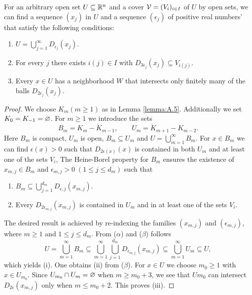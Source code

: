\begin{proposition}\label{proposition:A.6}
  For an arbitrary open set $U\subseteq{\ensuremath{\mathbb{R}}}^n$ and a cover $\mathcal{V}=(V_i)_{i\in I}$ of
  $U$ by open sets, we can find a sequence $(x_j)$ in $U$ and a sequence $(\epsilon_j)$ of positive
  real numbers' that satisfy the following conditions:
  \begin{enumerate}
    \item $U = \bigcup_{j=1}^\infty D_{\epsilon_j}(x_j)$.
    \item For every $j$ there exists $i(j)\in I$ with $D_{3\epsilon_j}(x_j)\subseteq V_{i(j)}$.
    \item Every $x\in U$ has a neighborhood $W$ that intersects only finitely many of the balls $D_{2\epsilon_j}(x_j)$.
  \end{enumerate}
\end{proposition}

\begin{proof}
  We choose $K_m(m\ge 1)$ as in Lemma \ref{lemma:A.5}. Additionally we set $K_0=K_{-1} = \varnothing$. For $m\ge 1$ we introduce
  the sets 
  \[
    B_m = K_m - \mathring{K}_{m-1}, \qquad U_m = \mathring{K}_{m+1} - K_{m-2}.
  \]
  Here $B_m$ is compact, $U_m$ is open, $B_m\subseteq U_m$ and $U = \bigcup_{m=1}^\infty B_m$. For $x\in B_m$
  we can find $\epsilon(x) > 0$ such that $D_{2\epsilon(x)}(x)$ is contained in both $U_m$ and at least
  one of the sets $V_i$, The Heine-Borel property for $B_m$ ensures the existence of
  $x_{m,j}\in B_m$ and $\epsilon_{m,j}>0\; (1\le j\le d_m)$ such that
  \begin{enumerate}
    \item[($\alpha$)] $B_m\subseteq \bigcup_{j=1}^{d_m} D_{\epsilon, j}(x_{m, j})$.
    \item[($\beta$)] Every $D_{2\epsilon_{m, j}}(x_{m, j})$ is contained in $U_m$ and in at least one of the sets $V_i$.
  \end{enumerate}
  The desired result is achieved by re-indexing the families $(x_{m, j})$ and $(\epsilon_{m, j})$, where 
  $m\ge 1$ and $1\le j\le d_m$. From ($\alpha$) and ($\beta$) follows 
  \[
    U = \bigcup_{m=1}^\infty B_m 
    \subseteq \bigcup_{m=1}^\infty\bigcup_{j=1}^{d_m} D_{\epsilon_{m, j}}(x_{m, j})
    \subseteq \bigcup_{m=1}^\infty U_m 
    \subseteq U,
  \]
  which yields (i). One obtains (ii) from ($\beta$). For $x\in U$ we choose $m_0\ge 1$ with 
  $x\in U_{m_0}$. Since $U_{m_0}\cap U_m =\varnothing$ when $m\ge m_0+3$, we see that $U{m_0}$ can intersect 
  $D_{2\epsilon}(x_{m, j})$ only when $m\le m_0+2$. This proves (iii).
\end{proof}


